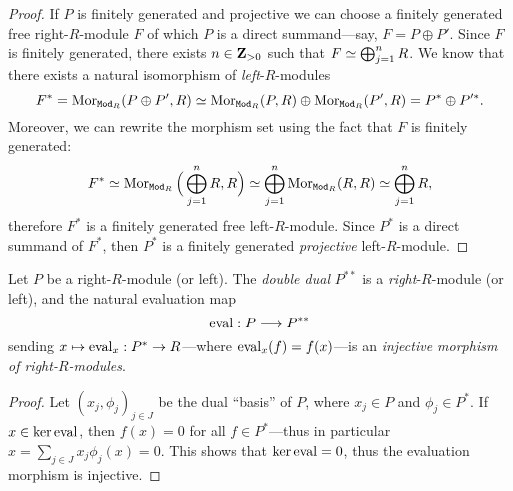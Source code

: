 \begin{proof}
    If \(P\) is finitely generated and projective we can choose a finitely generated
    free right-\(R\)-module \(F\) of which \(P\) is a direct summand---say, \(F = P
    \oplus P'\). Since \(F\) is finitely generated, there exists \(n \in \mathbf{Z}_{> 0}\)
    such that \(F \simeq \bigoplus_{j=1}^n R\). We know that there exists a natural
    isomorphism of \emph{left}-\(R\)-modules
    \[
        F^{*} = \operatorname{Mor}_{{\texttt{Mod}_{R}}}(P \oplus P', R)
        \simeq \operatorname{Mor}_{{\texttt{Mod}_{R}}}(P, R) \oplus \operatorname{Mor}_{{\texttt{Mod}_{R}}}(P', R)
        = P^{*} \oplus P'^{*}.
    \]
    Moreover, we can rewrite the morphism set using the fact that \(F\) is finitely
    generated:
    \[
        F^{*} \simeq \operatorname{Mor}_{{\texttt{Mod}_{R}}}\Big(\bigoplus_{j=1}^n R, R\Big)
        \simeq \bigoplus_{j=1}^n \operatorname{Mor}_{{\texttt{Mod}_{R}}}(R, R)
        \simeq \bigoplus_{j=1}^n R,
    \]
    therefore \(F^{*}\) is a finitely generated free left-\(R\)-module. Since
    \(P^{*}\) is a direct summand of \(F^{*}\), then \(P^{*}\) is a finitely
    generated \emph{projective} left-\(R\)-module.
\end{proof}

\begin{proposition}
    \label{prop:projective-module-evaluation-morphism-is-injective}
    Let \(P\) be a right-\(R\)-module (or left). The \emph{double dual} \(P^{* *}\)
    is a \emph{right}-\(R\)-module (or left), and the natural evaluation map
    \[
        \operatorname{eval}: P \longrightarrow P^{* *}
    \]
    sending \(x \mapsto \operatorname{eval}_x: P^{*} \to R\)---where \(\operatorname{eval}_x(f) = f(x)\)---is an
    \emph{injective morphism of right-\(R\)-modules}.
\end{proposition}

\begin{proof}
    Let \((x_j, \phi_j)_{j \in J}\) be the dual ``basis'' of \(P\), where
    \(x_j \in P\) and \(\phi_j \in P^{*}\). If \(x \in \ker \operatorname{eval}\), then
    \(f(x) = 0\) for all \(f \in P^{*}\)---thus in particular \(x = \sum_{j \in J}
    x_j \phi_j(x) = 0\). This shows that \(\ker \operatorname{eval} = 0\), thus the evaluation
    morphism is injective.
\end{proof}

